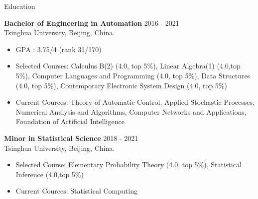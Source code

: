 \documentclass{resume} %
\begin{document}

\begin{rSection}{Education}

{\bf Bachelor of Engineering in Automation} \hfill {2016 - 2021}\\
Tsinghua University, Beijing, China.
	\begin{itemize}
		\item  GPA : 3.75/4 (rank 31/170)
		\item Selected Courses: Calculus B(2) (4.0, top 5\%), Linear Algebra(1) (4.0,top 5\%), Computer Languages and Programming (4.0, top 5\%), Data Structures (4.0, top 5\%), Contemporary Electronic System Design (4.0, top 5\%)
		\item Current Cources: Theory of Automatic Control, Applied Stochastic Processes, Numerical Analysis and Algorithms, Computer Networks and Applications, Foundation of Artificial Intelligence
	\end{itemize}


{\textbf{Minor in Statistical Science}}  \hfill 2018 - 2021\\
Tsinghua University, Beijing, China.
	\begin{itemize}
		\item Selected Course: Elementary Probability Theory (4.0, top 5\%), Statistical Inference (4.0,top 5\%)
		\item Current Cources: Statistical Computing
	\end{itemize}


\end{rSection}


\end{document}
